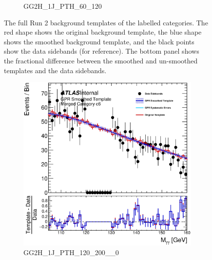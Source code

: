 \begin{figure}
\begin{center}
\begin{subfigure}[T]{0.49\linewidth}
	\caption{GG2H\_1J\_PTH\_60\_120}
\end{subfigure}
\caption{The full Run 2 background templates of the labelled categories. The red shape shows the original background template, the blue shape shows the smoothed background template, and the black points show the data sidebands (for reference). The bottom panel shows the fractional difference between the smoothed and un-smoothed templates and the data sidebands.}
\label{fig:gpr_coupcat_1}
\end{center}
\end{figure}


\begin{figure} 
\begin{center}
\begin{subfigure}[T]{0.49\linewidth}
	\centering
	\includegraphics[width=\linewidth]{figures/background/gpr/coupCatTemplates/GPR_Smoothed_Plot_hmgg_c6.eps}
	\caption{GG2H\_1J\_PTH\_120\_200\_\_0}
\end{subfigure}
\begin{subfigure}[T]{0.49\linewidth}
	\centering

\end{subfigure}
\end{center}
\end{figure}
